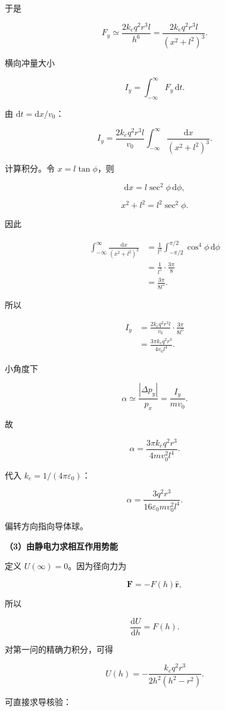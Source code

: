 \documentclass[12pt,a4paper,UTF8]{ctexart}
\begin{document}
于是

\[
F_y\simeq\frac{2k_eq^2r^3l}{h^6}
=\frac{2k_eq^2r^3l}{(x^2+l^2)^3}.
\]

横向冲量大小

\[
I_y=\int_{-\infty}^{\infty}F_y\,\mathrm{d}t.
\]

由 \(\mathrm{d}t=\mathrm{d}x/v_0\)：

\[
I_y=\frac{2k_eq^2r^3l}{v_0}
\int_{-\infty}^{\infty}\frac{\mathrm{d}x}{(x^2+l^2)^3}.
\]

计算积分。令 \(x=l\tan\phi\)，则

\[\mathrm{d}x=l\sec^2\phi\,\mathrm{d}\phi,\]

\[x^2+l^2=l^2\sec^2\phi.\]

因此

\[
\begin{aligned}
\int_{-\infty}^{\infty}\frac{\mathrm{d}x}{(x^2+l^2)^3}
&=\frac1{l^5}\int_{-\pi/2}^{\pi/2}\cos^4\phi\,\mathrm{d}\phi\\
&=\frac1{l^5}\cdot\frac{3\pi}{8}\\
&=\frac{3\pi}{8l^5}.
\end{aligned}
\]

所以

\[
\begin{aligned}
I_y
&=\frac{2k_eq^2r^3l}{v_0}\cdot\frac{3\pi}{8l^5}\\
&=\frac{3\pi k_eq^2r^3}{4v_0l^4}.
\end{aligned}
\]

小角度下

\[\alpha\simeq\frac{|\Delta p_y|}{p_x}=\frac{I_y}{mv_0}.\]

故

\[
\boxed{
\alpha=\frac{3\pi k_eq^2r^3}{4mv_0^2l^4}
}.
\]

代入 \(k_e=1/(4\pi\varepsilon_0)\)：

\[
\boxed{
\alpha=\frac{3q^2r^3}{16\varepsilon_0mv_0^2l^4}
}.
\]

偏转方向指向导体球。

\textbf{（3）由静电力求相互作用势能}

定义 \(U(\infty)=0\)。因为径向力为

\[\bm F=-F(h)\hat{\bm r},\]

所以

\[\frac{\mathrm{d}U}{\mathrm{d}h}=F(h).\]

对第一问的精确力积分，可得

\[
\boxed{
U(h)=-\frac{k_eq^2r^3}{2h^2(h^2-r^2)}
}.
\]

可直接求导核验：
\end{document}
